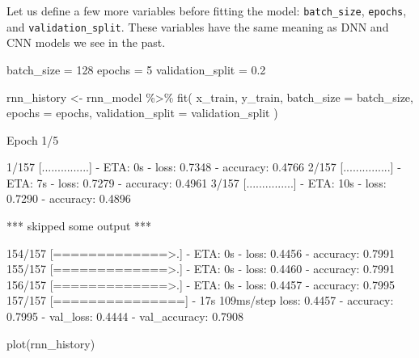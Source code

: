 \documentclass[
  12pt,
]{krantz}
\makeatletter
\newenvironment{Shaded}{\begin{snugshade}}{\end{snugshade}}
\newcommand{\AttributeTok}[1]{\textcolor[rgb]{0.61,0.61,0.61}{#1}}
\newcommand{\DecValTok}[1]{\textcolor[rgb]{0.06,0.06,0.06}{#1}}
\newcommand{\FloatTok}[1]{\textcolor[rgb]{0.06,0.06,0.06}{#1}}
\newcommand{\FunctionTok}[1]{\textcolor[rgb]{0,0,0}{#1}}
\newcommand{\NormalTok}[1]{#1}
\newcommand{\OtherTok}[1]{\textcolor[rgb]{0.37,0.37,0.37}{#1}}
\newcommand{\SpecialCharTok}[1]{\textcolor[rgb]{0,0,0}{#1}}
\newenvironment{kframe}{%
\medskip{}
\setlength{\fboxsep}{.8em}
 \def\at@end@of@kframe{}%
 \ifinner\ifhmode%
  \def\at@end@of@kframe{\end{minipage}}%
  \begin{minipage}{\columnwidth}%
 \fi\fi%
 \def\FrameCommand##1{\hskip\@totalleftmargin \hskip-\fboxsep
 \colorbox{shadecolor}{##1}\hskip-\fboxsep
     \hskip-\linewidth \hskip-\@totalleftmargin \hskip\columnwidth}%
 \MakeFramed {\advance\hsize-\width
   \@totalleftmargin\z@ \linewidth\hsize
   \@setminipage}}%
 {\par\unskip\endMakeFramed%
 \at@end@of@kframe}
\renewenvironment{Shaded}{\begin{kframe}}{\end{kframe}}
\makeatother
\begin{document}
Let us define a few more variables before fitting the model: \texttt{batch\_size}, \texttt{epochs}, and \texttt{validation\_split}. These variables have the same meaning as DNN and CNN models we see in the past.

\begin{Shaded}
\begin{Highlighting}[]
\NormalTok{batch\_size }\OtherTok{=} \DecValTok{128}
\NormalTok{epochs }\OtherTok{=} \DecValTok{5}
\NormalTok{validation\_split }\OtherTok{=} \FloatTok{0.2}

\NormalTok{rnn\_history }\OtherTok{\textless{}{-}}\NormalTok{ rnn\_model }\SpecialCharTok{\%\textgreater{}\%} \FunctionTok{fit}\NormalTok{(}
\NormalTok{  x\_train, y\_train,}
  \AttributeTok{batch\_size =}\NormalTok{ batch\_size,}
  \AttributeTok{epochs =}\NormalTok{ epochs,}
  \AttributeTok{validation\_split =}\NormalTok{ validation\_split}
\NormalTok{)}
\end{Highlighting}
\end{Shaded}

\begin{Shaded}
\begin{Highlighting}[]
\NormalTok{Epoch 1/5}

\NormalTok{  1/157 [...............] {-} ETA: 0s {-} loss: 0.7348 {-} accuracy: 0.4766}
\NormalTok{  2/157 [...............] {-} ETA: 7s {-} loss: 0.7279 {-} accuracy: 0.4961}
\NormalTok{  3/157 [...............] {-} ETA: 10s {-} loss: 0.7290 {-} accuracy: 0.4896}

\NormalTok{*** skipped some output ***}

\NormalTok{154/157 [=============\textgreater{}.] {-} ETA: 0s {-} loss: 0.4456 {-} accuracy: 0.7991}
\NormalTok{155/157 [=============\textgreater{}.] {-} ETA: 0s {-} loss: 0.4460 {-} accuracy: 0.7991}
\NormalTok{156/157 [=============\textgreater{}.] {-} ETA: 0s {-} loss: 0.4457 {-} accuracy: 0.7995}
\NormalTok{157/157 [===============] {-} 17s 109ms/step }
\NormalTok{loss: 0.4457 {-} accuracy: 0.7995 {-} val\_loss: 0.4444 {-} val\_accuracy: 0.7908}
\end{Highlighting}
\end{Shaded}

\begin{Shaded}
\begin{Highlighting}[]
\FunctionTok{plot}\NormalTok{(rnn\_history)}
\end{Highlighting}
\end{Shaded}
\end{document}
